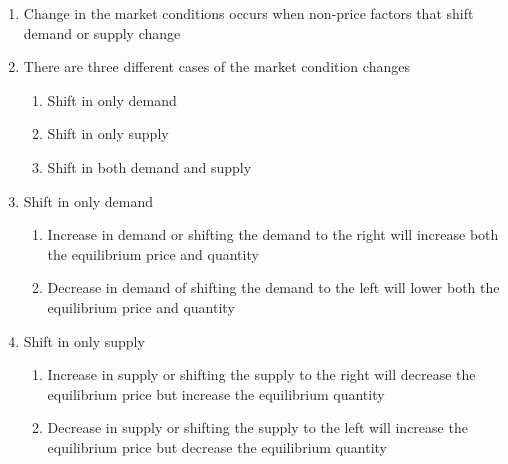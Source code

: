\documentclass[12pt]{article}
\begin{document}
\begin{enumerate}
        \begin{enumerate}

          \item Change in the market conditions occurs when non-price factors that shift demand or supply change

          \item There are three different cases of the market condition changes

            \begin{enumerate}

              \item Shift in only demand

              \item Shift in only supply

              \item Shift in both demand and supply

            \end{enumerate}

          \item Shift in only demand

            \begin{enumerate}

              \item Increase in demand or shifting the demand to the right will increase both the equilibrium price and quantity

              \item Decrease in demand of shifting the demand to the left will lower both the equilibrium price and quantity

            \end{enumerate}

          \item Shift in only supply

            \begin{enumerate}

              \item Increase in supply or shifting the supply to the right will decrease the equilibrium price but increase the equilibrium quantity

              \item Decrease in supply or shifting the supply to the left will increase the equilibrium price but decrease the equilibrium quantity

            \end{enumerate}
            

\end{enumerate}
\end{enumerate}
\end{document}
